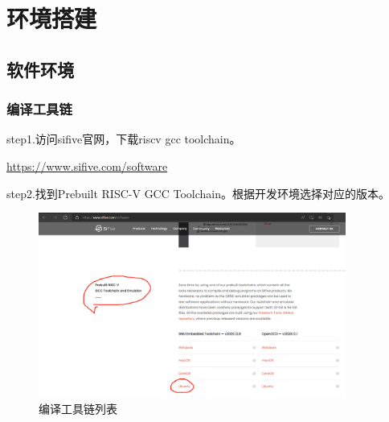 %
%
%
%
%

\chapter{环境搭建}

\section{软件环境}

\subsection{编译工具链}
step1.访问sifive官网，下载riscv gcc toolchain。

\href{https://www.sifive.com/software}{https://www.sifive.com/software}

step2.找到Prebuilt RISC-V GCC Toolchain。根据开发环境选择对应的版本。

\begin{figure}[htbp]
    \vspace{13pt} %
    \centering
    \includegraphics[width=0.9\textwidth]{images/toolchain.png}
    \caption{编译工具链列表}\label{编译工具链列表} %
\end{figure}

